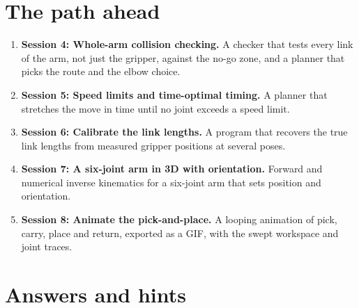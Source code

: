 \documentclass[11pt,a4paper]{article}
\begin{document}
\section{The path ahead}
\begin{enumerate}[nosep]
\item \textbf{Session 4: Whole-arm collision checking.} A checker that tests every link of the arm, not just the gripper, against the no-go zone, and a planner that picks the route and the elbow choice.
\item \textbf{Session 5: Speed limits and time-optimal timing.} A planner that stretches the move in time until no joint exceeds a speed limit.
\item \textbf{Session 6: Calibrate the link lengths.} A program that recovers the true link lengths from measured gripper positions at several poses.
\item \textbf{Session 7: A six-joint arm in 3D with orientation.} Forward and numerical inverse kinematics for a six-joint arm that sets position and orientation.
\item \textbf{Session 8: Animate the pick-and-place.} A looping animation of pick, carry, place and return, exported as a GIF, with the swept workspace and joint traces.
\end{enumerate}

\section{Answers and hints}
\end{document}
